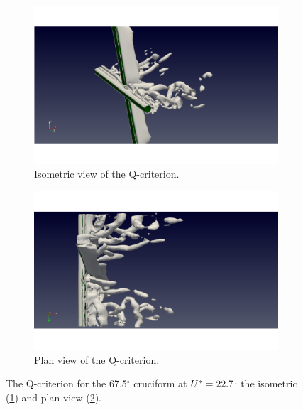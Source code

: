 \documentclass[oneside]{utmthesis}
\begin{document}
\begin{figure}
  \centering
  \begin{subfigure}[h]{0.9\textwidth}
    \includegraphics[width=\textwidth]{figs/qIso675U10}
    \caption{Isometric view of the Q-criterion.}
    \label{fig:qIso675U10}
  \end{subfigure}

  \begin{subfigure}[h]{0.9\textwidth}
    \includegraphics[width=\textwidth]{figs/qTop675U10}
    \caption{Plan view of the Q-criterion.}
    \label{fig:qTop675U10}
  \end{subfigure}

  \caption{The Q-criterion for the 67.5$^{\circ}$ cruciform at $U^{*} = 22.7$: the isometric (\ref{fig:qIso675U10}) and plan view (\ref{fig:qTop675U10}).} \label{fig:qCrit675U10}
\end{figure}
\end{document}
